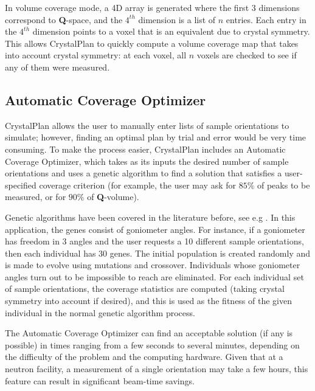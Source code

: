 \documentclass[final]{iucr}              %
\begin{document}
In volume coverage mode, a 4D array is generated where the first 3 dimensions
correspond to {\bf Q}-space, and the $4^{th}$ dimension is a list of $n$
entries. Each entry in the $4^{th}$ dimension points to a voxel that is an
equivalent due to crystal symmetry. This allows CrystalPlan to quickly compute a volume coverage
map that takes into account crystal symmetry: at each voxel, all $n$ voxels are
checked to see if any of them were measured. 



\subsection{Automatic Coverage Optimizer}

CrystalPlan allows the user to manually enter lists of sample orientations to
simulate; however, finding an optimal plan by trial and error would be very time
consuming. To make the process easier, CrystalPlan includes an Automatic
Coverage Optimizer, which takes as its inputs the desired number of sample
orientations and uses a genetic algorithm to find a solution that satisfies a
user-specified coverage criterion (for example, the user may ask for $85\%$ of
peaks to be measured, or for $90\%$ of {\bf Q}-volume).           

Genetic algorithms have been covered in the literature before, see e.g
\cite{Goldberg89}. In this application, the genes
consist of goniometer angles. For instance, if a goniometer has freedom in 3 angles and the user
requests a 10 different sample orientations, then each individual has 30 genes.
The initial population is created randomly and is made to evolve using mutations
and crossover. Individuals whose goniometer angles turn out to be impossible to
reach are eliminated. For each individual set of sample orientations, the
coverage statistics are computed (taking crystal symmetry into account if desired), and this is used as the fitness of the given individual in the normal genetic
algorithm process.             

The Automatic Coverage Optimizer can find an acceptable solution (if any is
possible) in times ranging from a few seconds to several minutes, depending on
the difficulty of the problem and the computing hardware. Given that at a
neutron facility, a measurement of a single orientation may take a few
hours, this feature can result in significant beam-time savings.           




\end{document}
